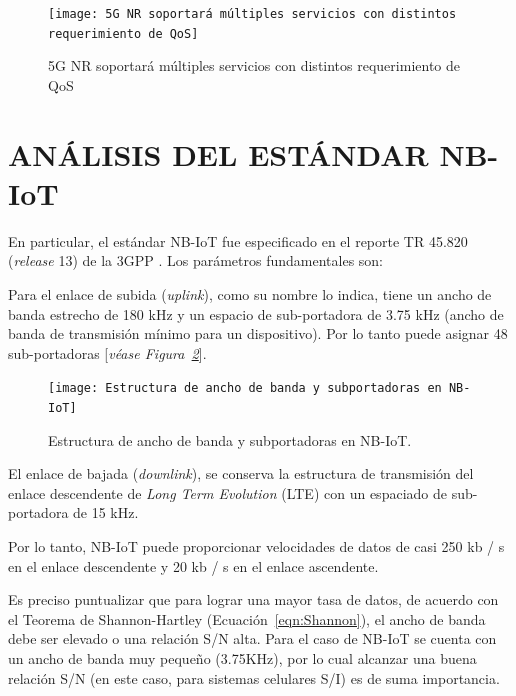 \begin{figure}[th]
\centering
\texttt{[image: 5G NR soportará múltiples servicios con distintos requerimiento de QoS]}
\decoRule
\caption[5G NR soportará múltiples servicios con distintos requerimiento de QoS]{5G NR soportará múltiples servicios con distintos requerimiento de QoS}
\label{fig:5gqos}
\end{figure}


\section{ANÁLISIS DEL ESTÁNDAR NB-IoT} \label{NBIoT}

En particular, el estándar NB-IoT fue especificado en el reporte TR 45.820 (\textit{release} 13) de la 3GPP \parencite{3GPP2019}. Los parámetros fundamentales son:\newline

Para el enlace de subida (\textit{uplink}), como su nombre lo indica, tiene un ancho de banda estrecho de 180 kHz y un espacio de sub-portadora de 3.75 kHz (ancho de banda de transmisión mínimo para un dispositivo). Por lo tanto puede asignar 48 sub-portadoras [\textit{véase Figura~\ref{fig:NBIoT}}].

\begin{figure}[th]
\centering
\texttt{[image: Estructura de ancho de banda y subportadoras en NB-IoT]}
\decoRule
\caption[Estructura de ancho de banda y subportadoras en NB-IoT.]{Estructura de ancho de banda y subportadoras en NB-IoT.}
\label{fig:NBIoT}
\end{figure}

El enlace de bajada (\textit{downlink}), se conserva la estructura de transmisión del enlace descendente de \textit{Long Term Evolution} (LTE) con un espaciado de sub-portadora de 15 kHz.\newline

Por lo tanto, NB-IoT puede proporcionar velocidades de datos de casi 250 kb / s en el enlace descendente y 20 kb / s en el enlace ascendente.\newline

Es preciso puntualizar que para lograr una mayor tasa de datos, de acuerdo con el Teorema de Shannon-Hartley (Ecuación~\ref{eqn:Shannon}), el ancho de banda debe ser elevado o una relación S/N alta. Para el caso de NB-IoT se cuenta con un ancho de banda muy pequeño (3.75KHz), por lo cual alcanzar una buena relación S/N (en este caso, para sistemas celulares S/I) es de suma importancia.\\

